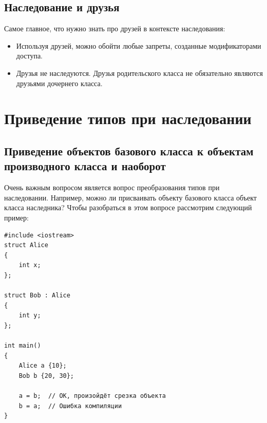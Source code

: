 \documentclass{article}
\begin{document}
\subsection*{Наследование и друзья}
Самое главное, что нужно знать про друзей в контексте наследования:
\begin{itemize}
\item Используя друзей, можно обойти любые запреты, созданные модификаторами доступа.
\item Друзья не наследуются. Друзья родительского класса не обязательно являются друзьями дочернего класса.
\end{itemize}



\newpage
\section{Приведение типов при наследовании}
\subsection*{Приведение объектов базового класса к объектам производного класса и наоборот}
Очень важным вопросом является вопрос преобразования типов при наследовании. Например, можно ли присваивать объекту базового класса объект класса наследника? Чтобы разобраться в этом вопросе рассмотрим следующий пример:
\begin{lstlisting}
#include <iostream>
struct Alice
{
	int x;
};

struct Bob : Alice
{
	int y;
};

int main()
{
	Alice a {10};
	Bob b {20, 30};

	a = b;  // ОК, произойдёт срезка объекта	
	b = a;  // Ошибка компиляции
}
\end{lstlisting}
\end{document}
